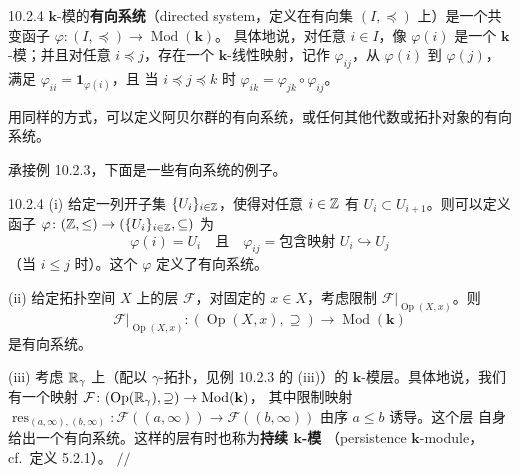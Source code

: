 \begin{wdefn}{10.2.4}
  $\mathbf{k}$-模的\textbf{有向系统}（directed system，定义在有向集 $(I,\preceq)$
  上）是一个共变函子 $\varphi\colon(I,\preceq)\to\operatorname{Mod}(\mathbf{k})$。
  具体地说，对任意 $i\in I$，像 $\varphi(i)$ 是一个 $\mathbf{k}$-模；并且对任意
  $i\preceq j$，存在一个 $\mathbf{k}$-线性映射，记作 $\varphi_{ij}$，从
  $\varphi(i)$ 到 $\varphi(j)$，满足 $\varphi_{ii}=\mathbf{1}_{\varphi(i)}$，且
  当 $i\preceq j\preceq k$ 时 $\varphi_{ik}=\varphi_{jk}\circ\varphi_{ij}$。
\end{wdefn}

用同样的方式，可以定义阿贝尔群的有向系统，或任何其他代数或拓扑对象的有向系统。

承接例 10.2.3，下面是一些有向系统的例子。

\begin{wexam}{10.2.4}
  (i) 给定一列开子集 $\{U_i\}_{i\in\mathbb{Z}}$，使得对任意 $i\in\mathbb{Z}$ 有
  $U_i\subset U_{i+1}$。则可以定义函子
  $\varphi\colon(\mathbb{Z},\le)\to(\{U_i\}_{i\in\mathbb{Z}},\subseteq)$ 为
  \[
    \varphi(i)=U_i\quad\text{且}\quad
    \varphi_{ij}=\text{包含映射 } U_i\hookrightarrow U_j
  \]
  （当 $i\le j$ 时）。这个 $\varphi$ 定义了有向系统。

  (ii) 给定拓扑空间 $X$ 上的层 $\mathcal{F}$，对固定的 $x\in X$，考虑限制
  $\mathcal{F}|_{\operatorname{Op}(X,x)}$。则
  \[
    \mathcal{F}|_{\operatorname{Op}(X,x)}\colon(\operatorname{Op}(X,x),\supseteq)
    \to\operatorname{Mod}(\mathbf{k})
  \]
  是有向系统。

  (iii) 考虑 $\mathbb{R}_\gamma$ 上（配以 $\gamma$-拓扑，见例 10.2.3 的 (iii)）的
  $\mathbf{k}$-模层。具体地说，我们有一个映射
  $\mathcal{F}\colon(\operatorname{Op}(\mathbb{R}_\gamma),\supseteq)\to\operatorname{Mod}(\mathbf{k})$，
  其中限制映射
  $\operatorname{res}_{(a,\infty),(b,\infty)}\colon
  \mathcal{F}((a,\infty))\to\mathcal{F}((b,\infty))$ 由序 $a\le b$ 诱导。这个层
  自身给出一个有向系统。这样的层有时也称为\textbf{持续 $\mathbf{k}$-模}
  （persistence $\mathbf{k}$-module，cf.\ 定义 5.2.1）。
  \hfill$//$
\end{wexam}


